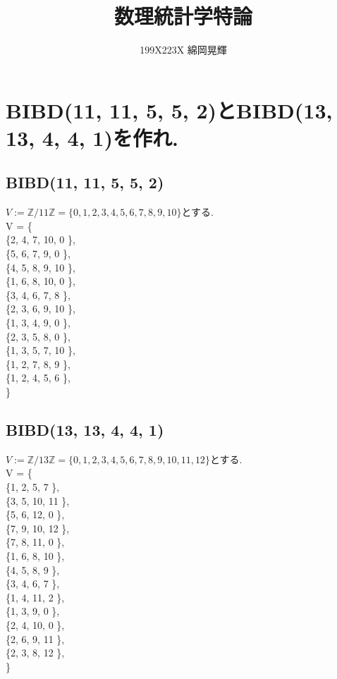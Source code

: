 \documentclass[uplatex]{jsarticle}
\title{\huge 数理統計学特論}
\author{199X223X 綿岡晃輝}
\affil{神戸大学大学院 システム情報学研究科 計算科学専攻}
\date{}
\begin{document}
    \maketitle
    \newpage
    
    \section{BIBD(11, 11, 5, 5, 2)とBIBD(13, 13, 4, 4, 1)を作れ.}
    \subsection{BIBD(11, 11, 5, 5, 2)}
    $V := \mathbb{Z}/11\mathbb{Z}=\{0, 1, 2, 3, 4, 5, 6, 7, 8, 9, 10\}$とする. \\
    V = \{ \\
    \{2,    4,    7,   10,   0 \}, \\ 
    \{5,    6,    7,    9,   0 \}, \\ 
    \{4,    5,    8,    9,  10 \}, \\
    \{1,    6,    8,   10,   0 \}, \\ 
    \{3,    4,    6,    7,   8 \}, \\
    \{2,    3,    6,    9,  10 \}, \\
    \{1,    3,    4,    9,   0 \}, \\ 
    \{2,    3,    5,    8,   0 \}, \\ 
    \{1,    3,    5,    7,  10 \}, \\
    \{1,    2,    7,    8,   9 \}, \\
    \{1,    2,    4,    5,   6 \}, \\
    \}

    \subsection{BIBD(13, 13, 4, 4, 1)}
    $V := \mathbb{Z}/13\mathbb{Z}=\{0, 1, 2, 3, 4, 5, 6, 7, 8, 9, 10, 11, 12\}$とする. \\
    V = \{ \\
    \{1,    2,    5,   7 \}, \\
    \{3,    5,   10,  11 \}, \\
    \{5,    6,   12,   0 \}, \\
    \{7,    9,   10,  12 \}, \\
    \{7,    8,   11,   0 \}, \\
    \{1,    6,    8,  10 \}, \\
    \{4,    5,    8,   9 \}, \\
    \{3,    4,    6,   7 \}, \\
    \{1,    4,   11,   2 \}, \\
    \{1,    3,    9,   0 \}, \\
    \{2,    4,   10,   0 \}, \\
    \{2,    6,    9,  11 \}, \\
    \{2,    3,    8,  12 \}, \\
    \}
\end{document}

